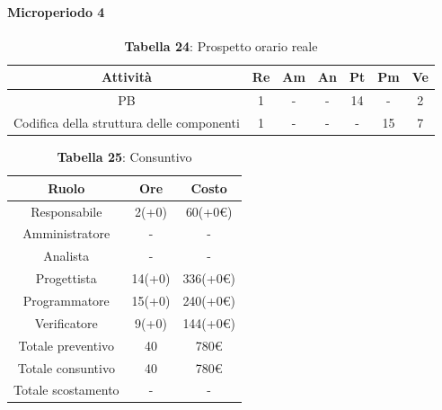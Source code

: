 \paragraph{Microperiodo 4}
\begin{table}[H]
	\centering
	\begin{tabular}{|c|c|c|c|c|c|c|}
		\hline
		\rowcolor{lighter-grayer}
		
		\textbf{Attività}                         & \textbf{Re} & \textbf{Am} & \textbf{An} & \textbf{Pt} & \textbf{Pm} & \textbf{Ve} \\ \hline
		PB                                        & 1           & -           & -           & 14          & -           & 2           \\ \hline
		Codifica della struttura delle componenti & 1           & -           & -           & -           & 15          & 7           \\ \hline	
		
	\end{tabular}
	\caption*{\textbf{Tabella 24}: Prospetto orario reale\\}
\end{table}

\begin{table}[H]
	\centering
	\renewcommand{\arraystretch}{1.5}
	\begin{tabular}{|c|c|c|}
		\hline
		\rowcolor{lighter-grayer}
		Ruolo & Ore & Costo \\ \hline
		Responsabile & 2(+0) & 60(+0\euro) \\ \hline
		Amministratore & - & - \\ \hline
		Analista & - & - \\ \hline
		Progettista & 14(+0) & 336(+0\euro) \\ \hline
		Programmatore & 15(+0) & 240(+0\euro) \\ \hline
		Verificatore & 9(+0) & 144(+0\euro) \\ \hline
		Totale preventivo & 40 & 780\euro \\ \hline
		Totale consuntivo & 40 & 780\euro \\ \hline
		Totale scostamento & - & - \\ \hline
	\end{tabular}
	\caption*{\textbf{Tabella 25}: Consuntivo\\}
\end{table}

